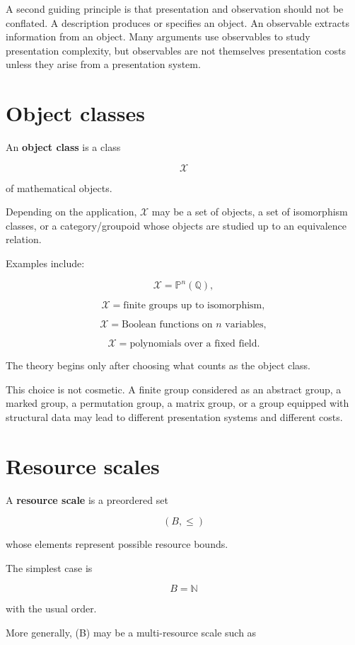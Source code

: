 \documentclass[11pt]{article}
\begin{document}
A second guiding principle is that presentation and observation should not be conflated. A description produces or specifies an object. An observable extracts information from an object. Many arguments use observables to study presentation complexity, but observables are not themselves presentation costs unless they arise from a presentation system.


\section{Object classes}

An \textbf{object class} is a class

\[
\mathcal X
\]

of mathematical objects.

Depending on the application, \(\mathcal X\) may be a set of objects, a set of isomorphism classes, or a category/groupoid whose objects are studied up to an equivalence relation.

Examples include:

\[
\mathcal X=\mathbb P^n(\mathbb Q),
\]

\[
\mathcal X={\text{finite groups up to isomorphism}},
\]

\[
\mathcal X={\text{Boolean functions on }n\text{ variables}},
\]

\[
\mathcal X={\text{polynomials over a fixed field}}.
\]

The theory begins only after choosing what counts as the object class.

This choice is not cosmetic. A finite group considered as an abstract group, a marked group, a permutation group, a matrix group, or a group equipped with structural data may lead to different presentation systems and different costs.


\section{Resource scales}

A \textbf{resource scale} is a preordered set

\[
(B,\leq)
\]

whose elements represent possible resource bounds.

The simplest case is

\[
B=\mathbb N
\]

with the usual order.

More generally, (B) may be a multi-resource scale such as
\end{document}
